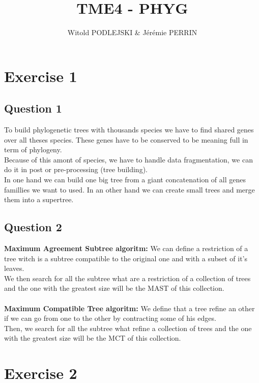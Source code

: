 \documentclass[]{article}
\title{TME4 - PHYG}
\author{Witold PODLEJSKI \& Jérémie PERRIN}
\theoremstyle{definition}
\begin{document}
\maketitle

\section{Exercise 1}
\subsection{Question 1}
To build phylogenetic trees with thousands species we have to find shared genes over all theses species. These genes have to be conserved to be meaning full in term of phylogeny.\\
Because of this amont of species, we have to handle data fragmentation, we can do it in post or pre-processing (tree building).\\
In one hand we can build one big tree from a giant concatenation of all genes famillies we want to used. In an other hand we can create small trees and merge them into a supertree.
\subsection{Question 2}
\textbf{Maximum Agreement Subtree algoritm:} We can define a restriction of a tree witch is a subtree compatible to the original one and with a subset of it's leaves.\\
 We then search for all the subtree what are a restriction of a collection of trees and the one with the greatest size will be the MAST of this collection. 
\\
\\
\textbf{Maximum Compatible Tree algoritm:} We define that a tree refine an other if we can go from one to the other by contracting some of his edges. \\
Then, we search for all the subtree what refine a collection of trees and the one with the greatest size will be the MCT of this collection. 
\section{Exercise 2}
\end{document}
